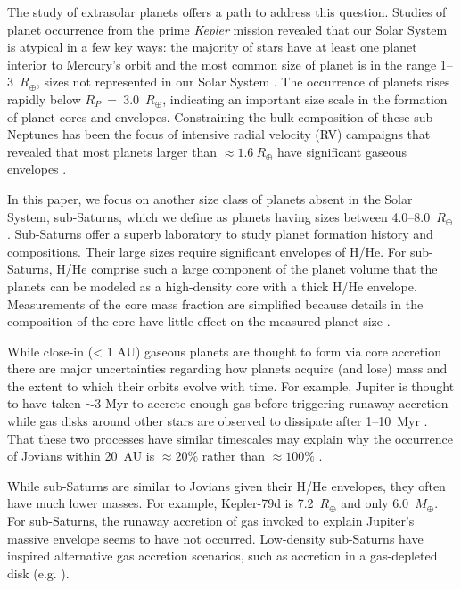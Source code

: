 \documentclass[preprint2]{aastex6}
\newcommand{\Kepler}{\textit{Kepler}\xspace}
\newcommand{\Rp}{\ensuremath{R_P}\xspace}
\newcommand{\Me}{\ensuremath{M_{\oplus}}\xspace}
\renewcommand{\Re}{\ensuremath{R_{\oplus}}\xspace}
\begin{document}
The study of extrasolar planets offers a path to address this question. Studies of planet occurrence from the prime \Kepler mission \citep{Borucki10a} revealed that our Solar System is atypical in a few key ways: the majority of stars have at least one planet interior to Mercury's orbit and the most common size of planet is in the range 1--3~\Re, sizes not represented in our Solar System \citep{Howard12,Fressin13,Petigura13b}. The occurrence of planets rises rapidly below \Rp~=~3.0~\Re, indicating an important size scale in the formation of planet cores and envelopes. Constraining the bulk composition of these sub-Neptunes has been the focus of intensive radial velocity (RV) campaigns that revealed that most planets larger than $\approx 1.6~\Re$ have significant gaseous envelopes \citep{Marcy14,Weiss14,Rogers15}.

In this paper, we focus on another size class of planets absent in the Solar System, sub-Saturns, which we define as planets having sizes between 4.0--8.0~\Re. Sub-Saturns offer a superb laboratory to study planet formation history and compositions. Their large sizes require significant envelopes of H/He. For sub-Saturns, H/He comprise such a large component of the planet volume that the planets can be modeled as a high-density core with a thick H/He envelope. Measurements of the core mass fraction are simplified because details in the composition of the core have little effect on the measured planet size \citep{Lopez14,Petigura16}.

While close-in (< 1 AU) gaseous planets are thought to form via core accretion \citep{Pollack96,Bodenheimer00,Hubickyj05,Mordasini08} there are major uncertainties regarding how planets acquire (and lose) mass and the extent to which their orbits evolve with time. For example, Jupiter is thought to have taken $\sim$3 Myr to accrete enough gas before triggering runaway accretion \citep{Hubickyj05} while gas disks around other stars are observed to dissipate after 1--10~Myr \citep{Mamajek09}. That these two processes have similar timescales may explain why the occurrence of Jovians within 20~AU is $\approx20\%$ rather than $\approx 100\%$ \citep{Cumming08}.

While sub-Saturns are similar to Jovians given their H/He envelopes, they often have much lower masses. For example, Kepler-79d is 7.2~\Re and only 6.0~\Me \citep{Jontof-Hutter14}. For sub-Saturns, the runaway accretion of gas invoked to explain Jupiter's massive envelope seems to have not occurred. Low-density sub-Saturns have inspired alternative gas accretion scenarios, such as accretion in a gas-depleted disk (e.g. \citealt{Lee15b}).
\end{document}
